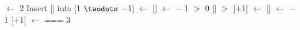 \documentclass{article}
\begin{document}
\begin{codebox}
\zi    \For {} $\leftarrow$ 2 \To {} \Do
\zi	\Comment  Insert [] into [1 $\twodots$ $-$1]
\zi        {} $\leftarrow$ []
\zi        {} $\leftarrow$  $-$ 1
\zi        \While {} $>$ 0  [] $>$  \Do
\zi            {}[$+$1] $\leftarrow$ []
\zi            {} $\leftarrow$  $-$ 1
\zi        \End
\zi        {}[$+$1] $\leftarrow$ 
\zi    \End
\zi    \If {} === 3 \Then \Do
{}
\zi    \End
\zi\End
\end{codebox}
\end{document}
